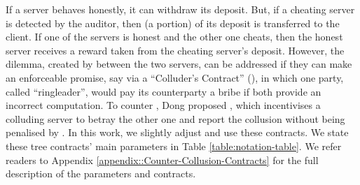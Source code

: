 If a server behaves honestly, it can withdraw its deposit. But, if a cheating server is detected by the auditor, then (a portion) of its deposit is transferred to the client. If one of the servers is honest and the other one cheats, then the honest server receives a reward taken from the cheating server's deposit. However, the dilemma, created by \SCpc between the two servers, can be addressed if they can make an enforceable promise, say via a ``Colluder's Contract'' (\SCcc),  in which one party, called ``ringleader'', would pay its counterparty a bribe if both provide an incorrect computation. To counter \SCcc, Dong   \et proposed \SCtc, which incentivises a colluding server to betray the other one and report the collusion without being penalised by \SCpc. In this work, we slightly adjust and use these contracts. We state these tree contracts' main parameters in Table \ref{table:notation-table}. We refer readers to Appendix \ref{appendix::Counter-Collusion-Contracts} for the full description of the parameters and contracts. 




%

